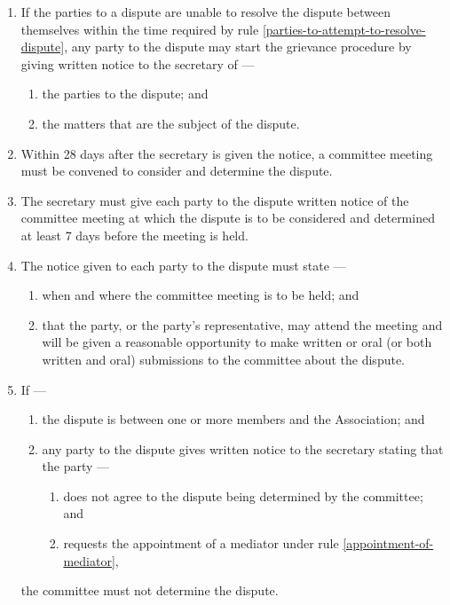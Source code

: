 \documentclass[../constitution.tex]{subfiles}
\begin{document}
\begin{enumerate}

  \item If the parties to a dispute are unable to resolve the dispute between themselves within the time required by rule \ref{parties-to-attempt-to-resolve-dispute}, any party to the dispute may start the grievance procedure by giving written notice to the secretary of ---

        \begin{enumerate}

          \item the parties to the dispute; and
          \item the matters that are the subject of the dispute.
        \end{enumerate}
  \item Within 28 days after the secretary is given the notice, a committee meeting must be convened to consider and determine the dispute.
  \item The secretary must give each party to the dispute written notice of the committee meeting at which the dispute is to be considered and determined at least 7 days before the meeting is held.
  \item The notice given to each party to the dispute must state ---

        \begin{enumerate}

          \item when and where the committee meeting is to be held; and
          \item that the party, or the party's representative, may attend the meeting and will be given a reasonable opportunity to make written or oral (or both written and oral) submissions to the committee about the dispute.
        \end{enumerate}
  \item If ---

        \begin{enumerate}

          \item the dispute is between one or more members and the Association; and
          \item any party to the dispute gives written notice to the secretary stating that the party ---

                \begin{enumerate}

                  \item does not agree to the dispute being determined by the committee; and
                  \item requests the appointment of a mediator under rule \ref{appointment-of-mediator}, \label{grievance-appoint-mediator}
                \end{enumerate}
        \end{enumerate}
        the committee must not determine the dispute.
\end{enumerate}
\end{document}
